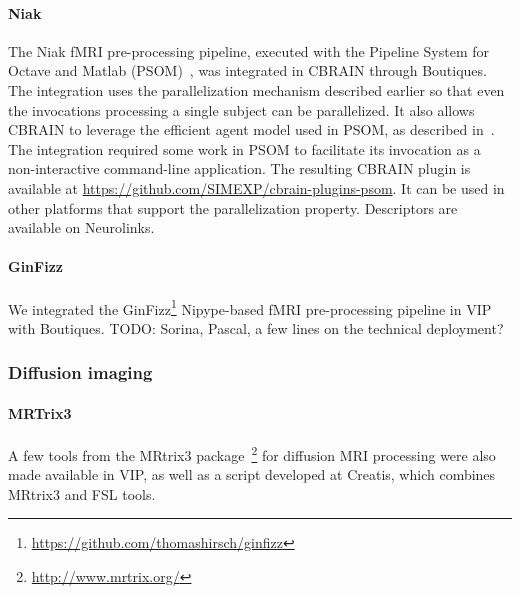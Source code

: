 \documentclass[a4paper,num-refs]{oup-contemporary}
\newcommand{\todo}[1]{\color{red}TODO: #1\color{black}}
\newcommand{\boutiques}{Boutiques\xspace}
\begin{document}
\paragraph{Niak} The Niak fMRI pre-processing pipeline, executed with the Pipeline System
for Octave and Matlab (PSOM)~\cite{bellec2012pipeline}, was integrated
in CBRAIN through \boutiques. The integration uses the parallelization
mechanism described earlier so that even the invocations processing a
single subject can be parallelized. It also allows CBRAIN to leverage
the efficient agent model used in PSOM, as described
in~\cite{GLAT-16}. The integration required some work in PSOM to
facilitate its invocation as a non-interactive command-line
application. The resulting CBRAIN plugin is available at
\url{https://github.com/SIMEXP/cbrain-plugins-psom}. It can be used in
other platforms that support the parallelization property. Descriptors
are available on Neurolinks.

\paragraph{GinFizz}
We integrated the
GinFizz\footnote{\url{https://github.com/thomashirsch/ginfizz}}
Nipype-based fMRI pre-processing pipeline in VIP with \boutiques. \todo{Sorina, Pascal, a few lines on the technical deployment?}

\subsubsection{Diffusion imaging}

\paragraph{MRTrix3}
A few tools from the MRtrix3
package~\cite{tournier2012mrtrix}\footnote{\url{http://www.mrtrix.org/}} for diffusion MRI processing were also made available in VIP,
as well as a script developed at Creatis, which combines MRtrix3 and
FSL tools.
\end{document}
